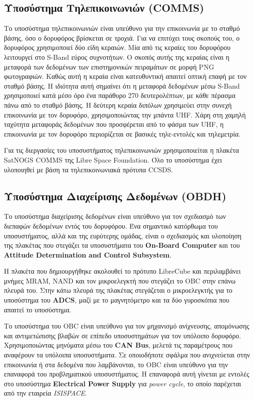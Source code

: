 \documentclass[a4paper,nobib,justified]{tufte-book}
\begin{document}
\subsection{Υποσύστημα Τηλεπικοινωνιών (\acs{COMMS})}
Το υποσύστημα τηλεπικοινωνιών είναι υπεύθυνο για την επικοινωνία με το σταθμό βάσης, όσο ο δορυφόρος βρίσκεται σε τροχιά. Για να επιτύχει τους σκοπούς του, ο δορυφόρος χρησιμοποιεί δύο είδη κεραιών. Μία από τις κεραίες του δορυφόρου λειτουργεί στο S-Band εύρος συχνοτήτων. Ο σκοπός αυτής της κεραίας είναι η μεταφορά των δεδομένων των επιστημονικών πειραμάτων σε μορφή PNG φωτογραφιών. Καθώς αυτή η κεραία είναι κατευθυντική απαιτεί οπτική επαφή με τον σταθμό βάσης. Η ιδιότητα αυτή σημαίνει ότι η μεταφορά δεδομένων μέσω S-Band χρησιμοποιεί κατά μέσο όρο ένα παράθυρο 270 δευτερολέπτων, με κάθε πέρασμα πάνω από το σταθμό βάσης. Η δεύτερη κεραία διπόλων χρησιμεύει στην συνεχή επικοινωνία με τον δορυφόρο, χρησιμοποιώντας την μπάντα UHF. Χάρη στη χαμηλή ταχύτητα μεταφοράς δεδομένων που προσφέρεται από το φάσμα των UHF, η επικοινωνία με τον δορυφόρο περιορίζεται σε βασικές τηλε-εντολές και τηλεμετρία.

Για τις διεργασίες του υποσυστήματος τηλεπικοινωνιών χρησιμοποιείται η πλακέτα SatNOGS COMMS της Libre Space Foundation. Όλο το υποσύστημα έχει υλοποιηθεί με βάση τα τηλεπικοινωνιακά πρότυπα CCSDS.

\subsection{Υποσύστημα Διαχείρισης Δεδομένων (\acs{OBDH})}
Το υποσύστημα διαχείρισης δεδομένων είναι υπεύθυνο για τον σχεδιασμό των διεπαφών δεδομένων εντός του δορυφόρου. Ένα σημαντικό κατόρθωμα του υποσυστήματος, αλλά και της ευρύτερης ομάδας, είναι ο σχεδιασμός και υλοποίηση της πλακέτας που στεγάζει τα υποσυστήματα του \textbf{On-Board Computer} και του \textbf{Attitude Determination and Control Subsystem}.

Η πλακέτα που δημιουργήθηκε ακολουθεί το πρότυπο LibreCube και περιλαμβάνει μνήμες MRAM, NAND και τον μικροελεγκτή που στεγάζει το OBC στην επάνω πλευρά του. Στην κάτω πλευρά της πλακέτας στεγάζεται ο μικροελεγκτής για το υποσύστημα του \textbf{ADCS}, μαζί με το μαγνητόμετρο και τα δύο γυροσκόπια που απαιτεί το υποσύστημα.

Το υποσύστημα του OBC είναι υπεύθυνο για τον μηχανισμό ανίχνευσης, απομόνωσης και αντιμετώπισης βλαβών σε επίπεδο υποσυστημάτων για τον υπόλοιπο δορυφόρο. Χρησιμοποιώντας μηνύματα μέσω του \textbf{CAN Bus}, μελετά τις παραμέτρους που αναφέρουν τα υπόλοιπα υποσυστήματα. Σε οποιοδήποτε σφάλμα που ανιχνεύεται στην επικοινωνία ή στα δεδομένα που λαμβάνονται, το OBC είναι υπεύθυνο για την επαναφορά του προβληματικού υποσυστήματος. Η επαναφορά αυτή γίνεται με εντολές στο υποσύστημα \textbf{Electrical Power Supply} για \emph{power cycle}, το οποίο παρέχεται από την εταιρεία \emph{ISISPACE}.
\end{document}
